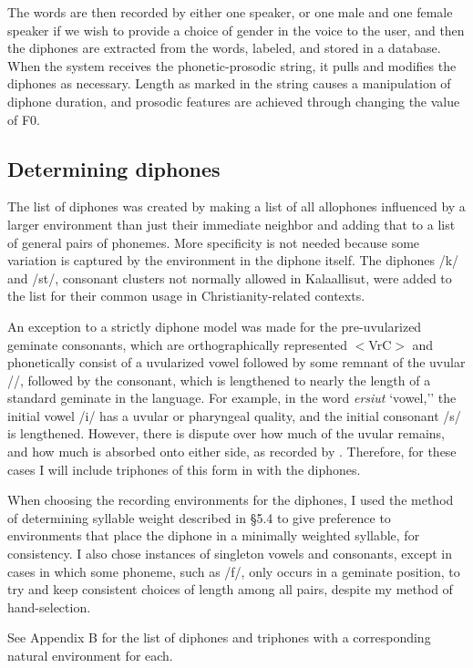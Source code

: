 \documentclass[12pt]{article}
\begin{document}
The words are then recorded by either one speaker, or one male and one female speaker if we wish to provide a choice of gender in the voice to the user, and then the diphones are extracted from the words, labeled, and stored in a database. When the system receives the phonetic-prosodic string, it pulls and modifies the diphones as necessary. Length as marked in the string causes a manipulation of diphone duration, and prosodic features are achieved through changing the value of F0.\par

	\subsection{Determining diphones}

	The list of diphones was created by making a list of all allophones influenced by a larger environment than just their immediate neighbor and adding that to a list of general pairs of phonemes. More specificity is not needed because some variation is captured by the environment in the diphone itself. The diphones /k\textinvscr/ and /st/, consonant clusters not normally allowed in Kalaallisut, were added to the list for their common usage in Christianity-related contexts.\par
	An exception to a strictly diphone model was made for the pre-uvularized geminate consonants, which are orthographically represented $<$VrC$>$ and phonetically consist of a uvularized vowel followed by some remnant of the uvular /\textinvscr/, followed by the consonant, which is lengthened to nearly the length of a standard geminate in the language. For example, in the word \textit{ersiut} `vowel,'' the initial vowel /i/ has a uvular or pharyngeal quality, and the initial consonant /s/ is lengthened. However, there is dispute over how much of the uvular remains, and how much is absorbed onto either side, as recorded by \citet{rischel}. Therefore, for these cases I will include triphones of this form in with the diphones. \par
	When choosing the recording environments for the diphones, I used the method of determining syllable weight described in \S 5.4 to give preference to environments that place the diphone in a minimally weighted syllable, for consistency. I also chose instances of singleton vowels and consonants, except in cases in which some phoneme, such as /f/, only occurs in a geminate position, to try and keep consistent choices of length among all pairs, despite my method of hand-selection. \par
	See Appendix B for the list of diphones and triphones with a corresponding natural environment for each. \par
\end{document}
